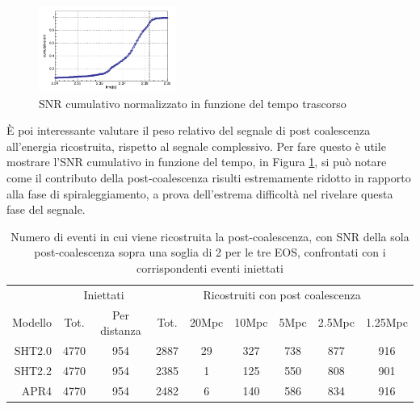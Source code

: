 \begin{figure}
	\begin{center}
		\includegraphics[width=0.4\textwidth]{figures/Capitolo_3/dump/1/V1_snr_cum_SHTdfdt_296.png}
	\end{center}
	\vspace{-12pt}
	\caption{SNR cumulativo normalizzato in funzione del tempo trascorso}
	\label{fig:snr_cum}
\end{figure}
È poi interessante valutare il peso relativo del segnale di post coalescenza all'energia ricostruita, rispetto al segnale complessivo. Per fare questo è utile mostrare l'SNR cumulativo in funzione del tempo, in Figura \ref{fig:snr_cum}, si può notare come il contributo della post-coalescenza risulti estremamente ridotto in rapporto alla fase di spiraleggiamento, a prova dell'estrema difficoltà nel rivelare questa fase del segnale.

\begin{table}[!]
	\vspace{-10pt}
	\centering
	\begin{tabular}{rcccccccc}
		\toprule
		&\multicolumn{2}{c}{Iniettati}	&\multicolumn{6}{c}{Ricostruiti con post coalescenza}\\
		Modello	&Tot. &Per distanza	&Tot. &20Mpc	&10Mpc	&5Mpc	&2.5Mpc	&1.25Mpc\\
		\midrule
		SHT2.0	&4770	&954	&2887	&29	&327	&738	&877	&916\\
		SHT2.2	&4770	&954	&2385	&1	&125	&550	&808	&901\\
		APR4	&4770	&954	&2482	&6	&140	&586	&834	&916\\
		\bottomrule
	\end{tabular}
	\caption{Numero di eventi in cui viene ricostruita la post-coalescenza, con SNR della sola post-coalescenza sopra una soglia di 2 per le tre EOS, confrontati con i corrispondenti eventi iniettati}
	\label{tab:ricostruiti_pm}
	\vspace{-10pt}
\end{table}

